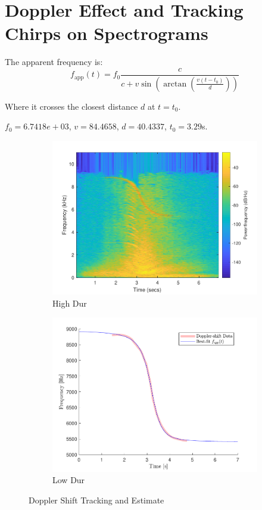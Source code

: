 \documentclass[10pt]{article}
\begin{document}
\section{Doppler Effect and Tracking Chirps on Spectrograms}
The apparent frequency is:
\[
f_\text{app}(t) = f_0 \frac{c}{c + v\sin\left(\arctan\left(\frac{v(t-t_0)}{d}\right)\right)}
\]

Where it crosses the closest distance $d$ at $t = t_0$.

$f_0 = 6.7418e+03$, $v = 84.4658$, $d=40.4337$, $t_0 = 3.29$s.

\begin{figure}[ht]
    \centering
    \begin{subfigure}[b]{0.48\textwidth}
        \includegraphics[width=\textwidth]{problem10_jet_spectrogram_doppler_shift_tracking.pdf}
        \caption{High Dur}
    \end{subfigure}
    \quad
    \begin{subfigure}[b]{0.48\textwidth}
        \includegraphics[width=\textwidth]{problem10_f_app_best_fit_estimate.pdf}
        \caption{Low Dur}
    \end{subfigure}
    \caption{Doppler Shift Tracking and Estimate\vspace{-0.5cm}}
    \label{doppler_shift_chirp}
\end{figure}
\end{document}

